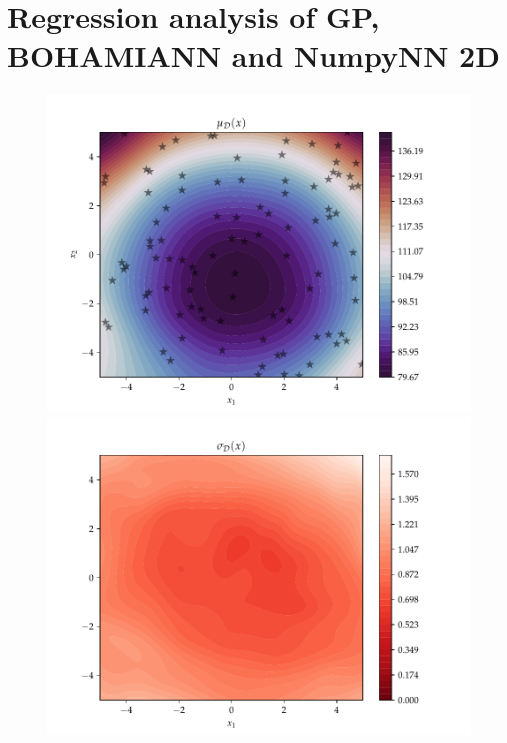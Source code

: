 \section{Regression analysis of GP, BOHAMIANN and NumpyNN 2D}

\begin{figure}[h]
  \centering
  \begin{minipage}[b]{0.49\textwidth}
   \includegraphics[trim=1.2cm 0.7cm 2cm 1cm,clip,width=\textwidth]{Figures/coco_reg/f1_BOHAMIANN2.pdf}
  \end{minipage}
  \hfill
  \begin{minipage}[b]{0.49\textwidth}
    \includegraphics[trim=1.2cm 0.7cm 2cm 1cm,clip,width=\textwidth]{Figures/coco_reg/f1_BOHAMIANN3.pdf}
   \end{minipage}
  

\end{figure}
